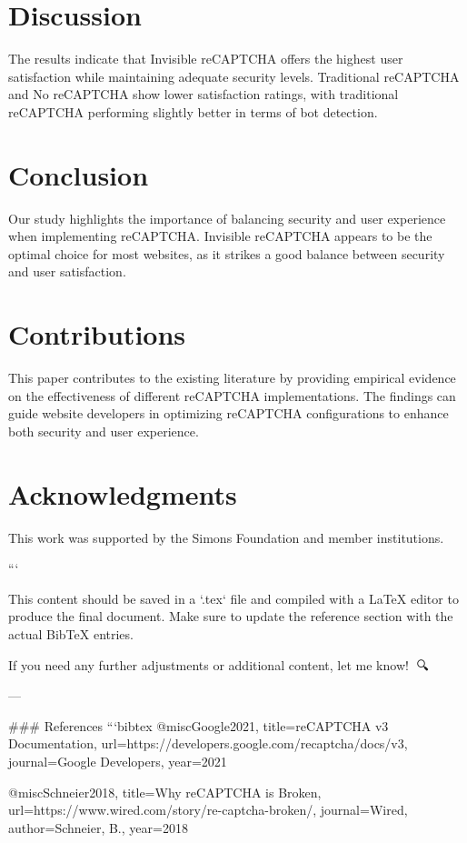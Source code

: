 \section{Discussion}
The results indicate that Invisible reCAPTCHA offers the highest user satisfaction while maintaining adequate security levels. Traditional reCAPTCHA and No reCAPTCHA show lower satisfaction ratings, with traditional reCAPTCHA performing slightly better in terms of bot detection.

\section{Conclusion}
Our study highlights the importance of balancing security and user experience when implementing reCAPTCHA. Invisible reCAPTCHA appears to be the optimal choice for most websites, as it strikes a good balance between security and user satisfaction.

\section{Contributions}
This paper contributes to the existing literature by providing empirical evidence on the effectiveness of different reCAPTCHA implementations. The findings can guide website developers in optimizing reCAPTCHA configurations to enhance both security and user experience.

\section{Acknowledgments}
This work was supported by the Simons Foundation and member institutions.





```

This content should be saved in a `.tex` file and compiled with a LaTeX editor to produce the final document. Make sure to update the reference section with the actual BibTeX entries. 

If you need any further adjustments or additional content, let me know! 🚀🔍

--- 

### References
```bibtex
@misc{Google2021,
  title={reCAPTCHA v3 Documentation},
  url={https://developers.google.com/recaptcha/docs/v3},
  journal={Google Developers},
  year={2021}
}

@misc{Schneier2018,
  title={Why reCAPTCHA is Broken},
  url={https://www.wired.com/story/re-captcha-broken/},
  journal={Wired},
  author={Schneier, B.},
  year={2018}
}

